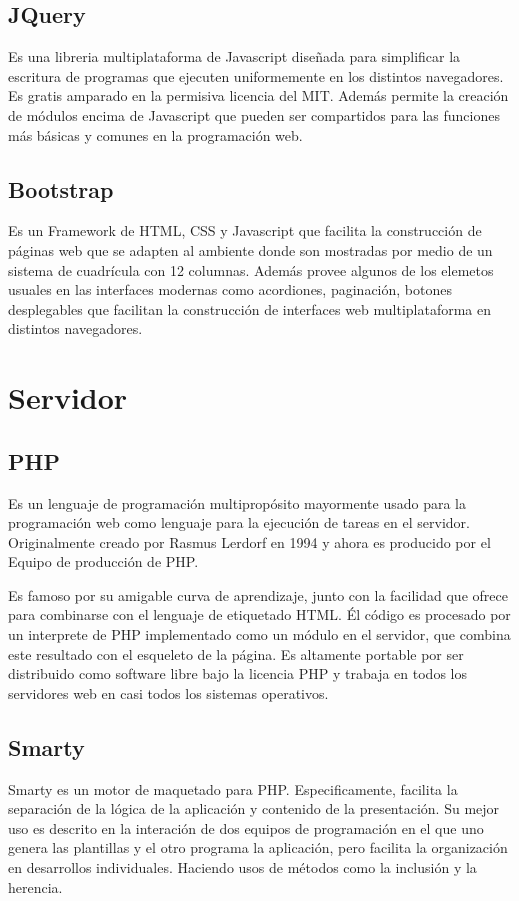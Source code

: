 \subsection{JQuery}
Es una libreria multiplataforma de Javascript diseñada para simplificar la escritura de programas que ejecuten uniformemente en los distintos navegadores. Es gratis amparado en la permisiva licencia del MIT. Además permite la creación de módulos encima de Javascript que pueden ser compartidos para las funciones más básicas y comunes en la programación web.


\subsection{Bootstrap}
Es un Framework de HTML, CSS y Javascript que facilita la construcción de páginas web que se adapten al ambiente donde son mostradas por medio de un sistema de cuadrícula con 12 columnas. Además provee algunos de los elemetos usuales en las interfaces modernas como acordiones, paginación, botones desplegables que facilitan la construcción de interfaces web multiplataforma en distintos navegadores.


\section{Servidor}

\subsection{PHP}

Es un lenguaje de programación multipropósito mayormente usado para la programación web como lenguaje para la ejecución de tareas en el servidor. Originalmente creado por Rasmus Lerdorf en 1994 y ahora es producido por el Equipo de producción de PHP. 

Es famoso por su amigable curva de aprendizaje, junto con la facilidad que ofrece para combinarse con el lenguaje de etiquetado HTML. Él código es procesado por un interprete de PHP implementado como un módulo en el servidor, que combina este resultado con el esqueleto de la página. Es altamente portable por ser distribuido como software libre bajo la licencia PHP y trabaja en todos los servidores web en casi todos los sistemas operativos.

\subsection{Smarty}
Smarty es un motor de maquetado para PHP. Especificamente, facilita la separación de la lógica de la aplicación y contenido de la presentación. Su mejor uso es descrito en la interación de dos equipos de programación en el que uno genera las plantillas y el otro programa la aplicación, pero facilita la organización en desarrollos individuales. Haciendo usos de métodos como la inclusión y la herencia.

